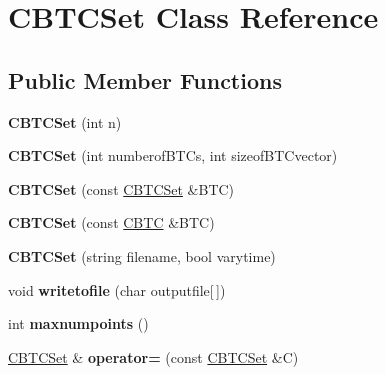 \hypertarget{class_c_b_t_c_set}{}\section{C\+B\+T\+C\+Set Class Reference}
\label{class_c_b_t_c_set}
\subsection*{Public Member Functions}
\begin{DoxyCompactItemize}
\item 
\mbox{\label{class_c_b_t_c_set_aaae92e2df9af021ce83e21d45339b1f9}} 
{\bfseries C\+B\+T\+C\+Set} (int n)
\item 
\mbox{\label{class_c_b_t_c_set_aa87f711f166cc659ca26e271d2d6744e}} 
{\bfseries C\+B\+T\+C\+Set} (int numberof\+B\+T\+Cs, int sizeof\+B\+T\+Cvector)
\item 
\mbox{\label{class_c_b_t_c_set_a416842e29f03fa8c57e49d9690916cb0}} 
{\bfseries C\+B\+T\+C\+Set} (const \hyperlink{class_c_b_t_c_set}{C\+B\+T\+C\+Set} \&B\+TC)
\item 
\mbox{\label{class_c_b_t_c_set_a2595fee08a4aaf9ab9378161df83bb0d}} 
{\bfseries C\+B\+T\+C\+Set} (const \hyperlink{class_c_b_t_c}{C\+B\+TC} \&B\+TC)
\item 
\mbox{\label{class_c_b_t_c_set_a35aa03e09b23670aeb9ca8455076a81e}} 
{\bfseries C\+B\+T\+C\+Set} (string filename, bool varytime)
\item 
\mbox{\label{class_c_b_t_c_set_a952adca2779754e249b7fe03312a5df6}} 
void {\bfseries writetofile} (char outputfile\mbox{[}$\,$\mbox{]})
\item 
\mbox{\label{class_c_b_t_c_set_af985e54c99ec4d26760cd940ec38815b}} 
int {\bfseries maxnumpoints} ()
\item 
\mbox{\label{class_c_b_t_c_set_a6d3239b52c3679998a86d27da39913d1}} 
\hyperlink{class_c_b_t_c_set}{C\+B\+T\+C\+Set} \& {\bfseries operator=} (const \hyperlink{class_c_b_t_c_set}{C\+B\+T\+C\+Set} \&C)
\item 

\end{DoxyCompactItemize}

